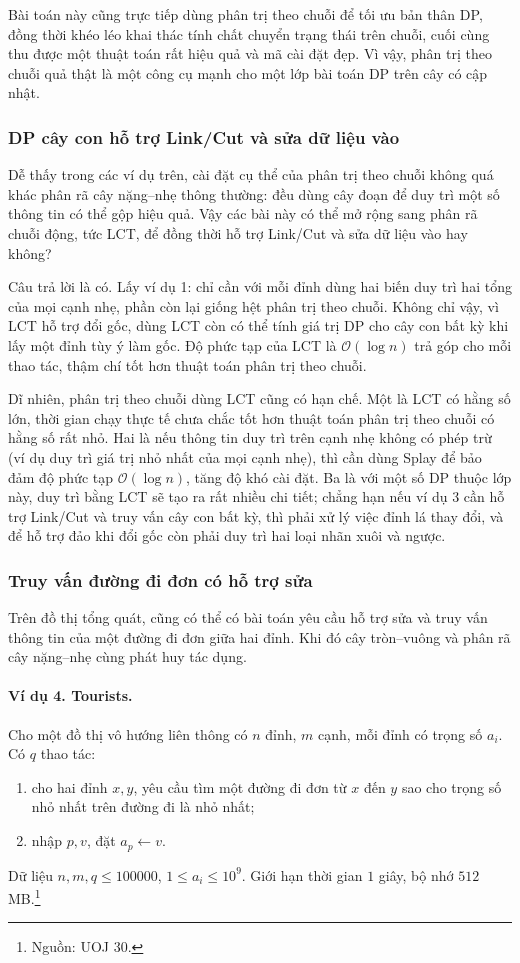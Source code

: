 \documentclass[11pt]{article}
\newcommand{\Oh}{\mathcal{O}}
\begin{document}
Bài toán này cũng trực tiếp dùng phân trị theo chuỗi để tối ưu bản thân DP,
đồng thời khéo léo khai thác tính chất chuyển trạng thái trên chuỗi, cuối cùng
thu được một thuật toán rất hiệu quả và mã cài đặt đẹp. Vì vậy, phân trị theo
chuỗi quả thật là một công cụ mạnh cho một lớp bài toán DP trên cây có cập
nhật.

\subsubsection{DP cây con hỗ trợ Link/Cut và sửa dữ liệu vào}

Dễ thấy trong các ví dụ trên, cài đặt cụ thể của phân trị theo chuỗi không quá
khác phân rã cây nặng--nhẹ thông thường: đều dùng cây đoạn để duy trì một số
thông tin có thể gộp hiệu quả. Vậy các bài này có thể mở rộng sang phân rã
chuỗi động, tức LCT, để đồng thời hỗ trợ Link/Cut và sửa dữ liệu vào hay
không?

Câu trả lời là có. Lấy ví dụ 1: chỉ cần với mỗi đỉnh dùng hai biến duy trì hai
tổng của mọi cạnh nhẹ, phần còn lại giống hệt phân trị theo chuỗi. Không chỉ
vậy, vì LCT hỗ trợ đổi gốc, dùng LCT còn có thể tính giá trị DP cho cây con
bất kỳ khi lấy một đỉnh tùy ý làm gốc. Độ phức tạp của LCT là \(\Oh(\log n)\)
trả góp cho mỗi thao tác, thậm chí tốt hơn thuật toán phân trị theo chuỗi.

Dĩ nhiên, phân trị theo chuỗi dùng LCT cũng có hạn chế. Một là LCT có hằng số
lớn, thời gian chạy thực tế chưa chắc tốt hơn thuật toán phân trị theo chuỗi
có hằng số rất nhỏ. Hai là nếu thông tin duy trì trên cạnh nhẹ không có phép
trừ (ví dụ duy trì giá trị nhỏ nhất của mọi cạnh nhẹ), thì cần dùng Splay để
bảo đảm độ phức tạp \(\Oh(\log n)\), tăng độ khó cài đặt. Ba là với một số DP
thuộc lớp này, duy trì bằng LCT sẽ tạo ra rất nhiều chi tiết; chẳng hạn nếu ví
dụ 3 cần hỗ trợ Link/Cut và truy vấn cây con bất kỳ, thì phải xử lý việc đỉnh
lá thay đổi, và để hỗ trợ đảo khi đổi gốc còn phải duy trì hai loại nhãn xuôi
và ngược.

\subsubsection{Truy vấn đường đi đơn có hỗ trợ sửa}

Trên đồ thị tổng quát, cũng có thể có bài toán yêu cầu hỗ trợ sửa và truy vấn
thông tin của một đường đi đơn giữa hai đỉnh. Khi đó cây tròn--vuông và phân
rã cây nặng--nhẹ cùng phát huy tác dụng.

\paragraph{Ví dụ 4. Tourists.}
Cho một đồ thị vô hướng liên thông có \(n\) đỉnh, \(m\) cạnh, mỗi đỉnh có
trọng số \(a_i\). Có \(q\) thao tác:
\begin{enumerate}
  \item cho hai đỉnh \(x,y\), yêu cầu tìm một đường đi đơn từ \(x\) đến \(y\)
  sao cho trọng số nhỏ nhất trên đường đi là nhỏ nhất;
  \item nhập \(p,v\), đặt \(a_p\gets v\).
\end{enumerate}
Dữ liệu \(n,m,q\le 100000\), \(1\le a_i\le 10^9\). Giới hạn thời gian \(1\)
giây, bộ nhớ \(512\) MB.\footnote{Nguồn: UOJ 30.}
\end{document}

